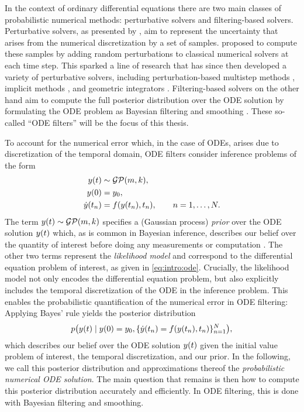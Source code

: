 \documentclass{mimosis}
\begin{document}
In the context of ordinary differential equations there are two main classes of probabilistic numerical methods: perturbative solvers and filtering-based solvers.
Perturbative solvers, as presented by \textcite{chkrebtii2016}, aim to represent the uncertainty that arises from the numerical discretization by a set of samples.
\textcite{conrad2017statistical} proposed to compute these samples by adding random perturbations to classical numerical solvers at each time step.
This sparked a line of research that has since then developed a variety of perturbative solvers,
including perturbation-based multistep methods \parencite{teymur2016}, implicit methods \parencite{Teymur2018}, and geometric integrators \parencite{Abdulle2020}.
Filtering-based solvers on the other hand aim to compute the full posterior distribution over the ODE solution by formulating the ODE problem as Bayesian filtering and smoothing
\parencite{schober16_probab_model_numer_solut_initial_value_probl,kersting18_conver_rates_gauss_ode_filter,tronarp18_probab_solut_to_ordin_differ}.
These so-called ``ODE filters'' will be the focus of this thesis.

To account for the numerical error which, in the case of ODEs, arises due to discretization of the temporal domain, ODE filters consider inference problems of the form
\begin{subequations}
\begin{align}
  \val(t) &\sim \GP(m, k), \\
  \val(0) &= \val_0, \\
  \dot{\val}(t_\idxt) &= \vf( \val(t_\idxt), t_\idxt), \qquad \idxt = 1, \dots, \idxtmax.
\end{align}
\end{subequations}
The term \(\val(t) \sim \GP(m, k)\) specifies a (Gaussian process) \emph{prior} over the ODE solution \(y(t)\) which, as is common in Bayesian inference, describes our belief over the quantity of interest before doing any measurements or computation
\parencite{rasmussen2005gpml}.
The other two terms represent the \emph{likelihood model} and correspond to the differential equation problem of interest, as given in \cref{eq:intro:ode}.
Crucially, the likelihood model not only encodes the differential equation problem, but also explicitly includes the temporal discretization of the ODE in the inference problem.
This enables the probabilistic quantification of the numerical error in ODE filtering:
Applying Bayes' rule yields the posterior distribution
\begin{equation}
  \label{eq:intro:pnodesolution}
  \p( \val(t) \mid \val(0) = \val_0, \{\dot{\val}(t_\idxt) = \vf( \val(t_\idxt), t_\idxt)\}_{\idxt=1}^\idxtmax ),
\end{equation}
which describes our belief over the ODE solution \(y(t)\) given the initial value problem of interest, the temporal discretization, and our prior.
In the following, we call this posterior distribution and approximations thereof the \emph{probabilistic numerical ODE solution}.
The main question that remains is then how to compute this posterior distribution accurately and efficiently.
In ODE filtering, this is done with Bayesian filtering and smoothing.
\end{document}
